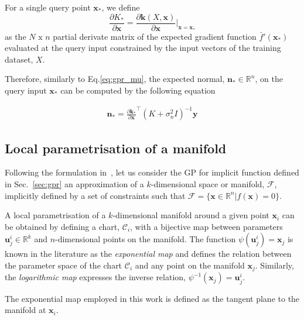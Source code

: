 For a single query point $\mathbf{x}_*$, we define 
$$
\frac{\partial K_*}{\partial\mathbf{x}}=\frac{\partial\mathbf{k}(X,\mathbf{x})}{\partial\mathbf{x}}\vert_{\mathbf{x}=\mathbf{x}_*}
$$ 
as the $N\text{ x }n$ partial derivate matrix of the expected gradient function $\bar{f}'(\mathbf{x}_*)$ evaluated at the query input constrained by the input vectors of the training dataset, $X$. 

Therefore, similarly to Eq.\ref{eq:gpr_mu}, the expected normal, $\mathbf{n}_*\in\mathbb{R}^n$, on the query input $\mathbf{x}_*$ can be computed by the following equation

\begin{eqnarray}
\label{eq:gpr_n}
\mathbf{n}_*=\frac{\partial\mathbf{k}_*}{\partial\mathbf{x}}^\top(K+\sigma_n^2I)^{-1}\mathbf{y}
\end{eqnarray}

\subsection{Local parametrisation of a manifold}

Following the formulation in~\cite{Jaillet2013Path}, let us consider the GP for implicit function defined in Sec.~\ref{sec:gpr} an approximation of a $k$-dimensional space or manifold, $\mathcal{F}$, implicitly defined by a set of constraints such that $\mathcal{F}=\{\mathbf{x}\in\mathbb{R}^n|f(\mathbf{x})=0\}$. 

A local parametrisation of a $k$-dimensional manifold around a given point $\mathbf{x}_i$ can be obtained by defining a chart, $\mathcal{C}_i$, with a bijective map between parameters $\mathbf{u}_j^i\in\mathbb{R}^k$ and $n$-dimensional points on the manifold. The function $\psi(\mathbf{u}_j^i)=\mathbf{x}_j$ is known in the literature as the \emph{exponential map} and defines the relation between the parameter space of the chart $\mathcal{C}_i$ and any point on the manifold $\mathbf{x}_j$. Similarly, the \emph{logarithmic map} expresses the inverse relation, $\psi^{-1}(\mathbf{x}_j)= \mathbf{u}_j^i$.

The exponential map employed in this work is defined as the tangent plane to the manifold at $\mathbf{x}_i$.

